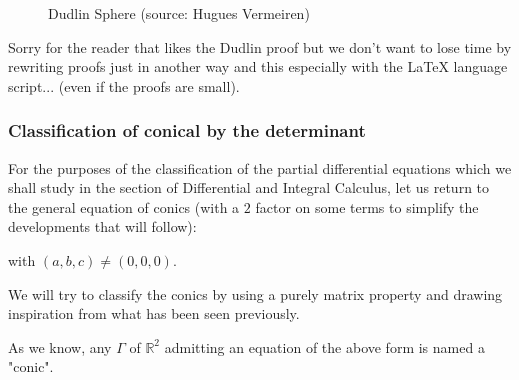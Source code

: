 \begin{figure}[H]
\begin{center}
	\end{center}
		\caption[Dudlin Sphere]{Dudlin Sphere (source: Hugues Vermeiren)}
	\end{figure}
	Sorry for the reader that likes the Dudlin proof but we don't want to lose time by rewriting proofs just in another way and this especially with the \LaTeX{} language script... (even if the proofs are small). 
	
	\subsubsection{Classification of conical by the determinant}\label{classification of conical by the determinant}
	For the purposes of the classification of the partial differential equations which we shall study in the section of Differential and Integral Calculus, let us return to the general equation of conics (with a $2$ factor on some terms to simplify the developments that will follow):
	
	with $(a,b,c)\neq (0,0,0)$. 

	We will try to classify the conics by using a purely matrix property and drawing inspiration from what has been seen previously.

	As we know, any $\Gamma$ of $\mathbb{R}^2$ admitting an equation of the above form is named a "conic".

